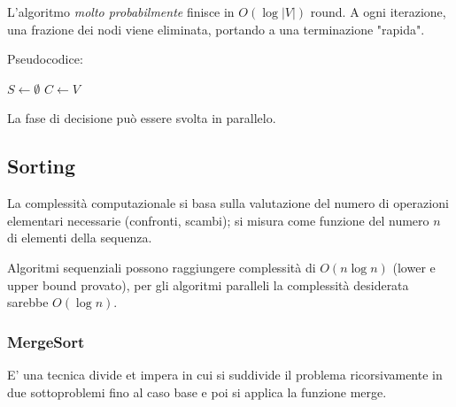L'algoritmo \textit{molto probabilmente} finisce in $O(\log |V|)$ round. A ogni iterazione, una frazione dei nodi viene eliminata, portando a una terminazione "rapida".

Pseudocodice:
\begin{center}
    \begin{minipage}{.63\textwidth}
        \begin{tcolorbox}[
            colback=white,
            sharp corners,
            boxrule=.3mm,
            left=20pt,
            top=0pt,
            bottom=0pt,
            colbacktitle=white,
            coltitle=black
            ]
            \begin{algorithm}[H]
                \caption{Parallel Randomized MIS}
                $S \leftarrow \emptyset$\;
                $C \leftarrow V$\;
                \;
            \end{algorithm}
        \end{tcolorbox}
    \end{minipage}
\end{center}

La fase di decisione può essere svolta in parallelo.

\subsection{Sorting}

La complessità computazionale si basa sulla valutazione del numero di operazioni elementari necessarie (confronti, scambi); si misura come funzione del numero $n$ di elementi della sequenza.

Algoritmi sequenziali possono raggiungere complessità di $O (n \log n)$ (lower e upper bound provato), per gli algoritmi paralleli la complessità desiderata sarebbe $O (\log n)$.

\subsubsection{MergeSort}
E' una tecnica divide et impera in cui si suddivide il problema ricorsivamente in due sottoproblemi fino al caso base e poi si applica la funzione merge.

